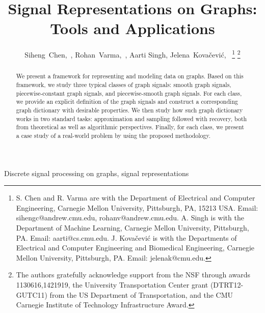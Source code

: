 \documentclass[journal,twocolumn,10pt]{IEEEtran}
\theoremstyle{definition}
\begin{document}
\title{ Signal Representations on Graphs: Tools and Applications }
\author{Siheng~Chen,~, Rohan~Varma,~, Aarti Singh,   Jelena~Kova\v{c}evi\'c,~%
  \thanks{S. Chen and R. Varma are with the Department of Electrical and Computer
    Engineering, Carnegie Mellon University, Pittsburgh, PA, 15213
    USA. Email: sihengc@andrew.cmu.edu, rohanv@andrew.cmu.edu. A. Singh is with the Department of Machine Learning, Carnegie Mellon University, Pittsburgh, PA. Email: aarti@cs.cmu.edu. J. Kova\v{c}evi\'c is with the
      Departments of Electrical and
      Computer Engineering and Biomedical Engineering, Carnegie Mellon University, Pittsburgh,
      PA. Email: jelenak@cmu.edu.  }%
  \thanks{The authors gratefully acknowledge support from the NSF through awards
1130616,1421919,  the University Transportation Center grant (DTRT12-GUTC11)
from the US Department of Transportation, and the CMU Carnegie
Institute of Technology Infrastructure Award.}%
}
 \maketitle


\tableofcontents


\begin{abstract}
We present a framework for representing and modeling data on graphs. Based on this framework, we study three typical classes of graph signals: smooth graph signals, piecewise-constant graph signals, and piecewise-smooth graph signals. For each class, we provide an explicit definition of the graph signals and construct a
corresponding graph dictionary with desirable properties. We then study how such graph dictionary works in two
standard tasks: approximation and sampling followed
with recovery, both from theoretical as well as algorithmic perspectives. Finally, for each class, we present a case study of a real-world problem by using the proposed methodology.
\end{abstract}
\begin{keywords}
Discrete signal processing on graphs, signal representations
\end{keywords}




\end{document}
